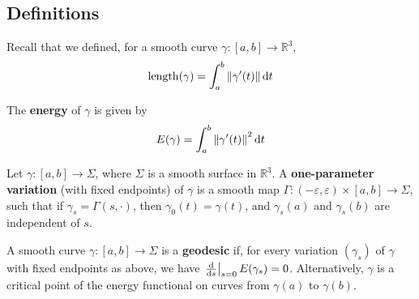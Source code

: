 \documentclass[a4paper,11pt]{article}
\begin{document}
\subsection{Definitions}
Recall that we defined, for a smooth curve \( \gamma \colon [a,b] \to \mathbb R^3 \),
\[
	\mathrm{length}(\gamma) = \int_a^b \norm{\gamma'(t)} \dd{t}
\]
\begin{definition}
	The \textbf{energy} of \( \gamma \) is given by
	\[
		E(\gamma) = \int_a^b \norm{\gamma'(t)}^2 \dd{t}
	\]
\end{definition}
\begin{definition}
	Let \( \gamma \colon [a,b] \to \Sigma \), where \( \Sigma \) is a smooth surface in \( \mathbb R^3 \).
	A \textbf{one-parameter variation} (with fixed endpoints) of \( \gamma \) is a smooth map \( \Gamma \colon (-\varepsilon, \varepsilon) \times [a,b] \to \Sigma \), such that if \( \gamma_s = \Gamma(s,\cdot) \), then
	\( \gamma_0(t) = \gamma(t) \), and \( \gamma_s(a) \) and \( \gamma_s(b) \) are independent of \( s \).
\end{definition}
\begin{definition}
	A smooth curve \( \gamma \colon [a,b] \to \Sigma \) is a \textbf{geodesic} if, for every variation \( (\gamma_s) \) of \( \gamma \) with fixed endpoints as above, we have \( \eval{\dv{s}}_{s=0} E(\gamma_s) = 0 \).
	Alternatively, \( \gamma \) is a critical point of the energy functional on curves from \( \gamma(a) \) to \( \gamma(b) \).
\end{definition}
\end{document}
